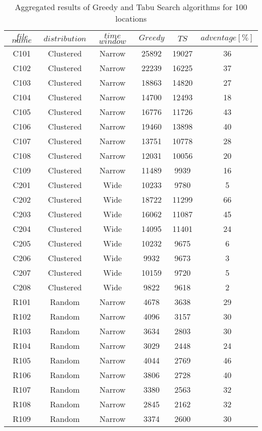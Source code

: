 \begin{table}[t]
\centering
\caption{
Aggregated results of Greedy and Tabu Search algorithms for 100 locations}
\begin{tabular*}{0.8\linewidth}{@{\extracolsep{\fill}}cccccc}
\toprule
$file$ $name$ & $distribution$ & $time$ $window$ & $Greedy$ & $TS$ & $adventage[\%]$ \\ \midrule
C101 & Clustered & Narrow & 25892 & 19027 & 36\\
C102 & Clustered & Narrow & 22239 & 16225 & 37\\
C103 & Clustered & Narrow & 18863 & 14820 & 27\\
C104 & Clustered & Narrow & 14700 & 12493 & 18\\
C105 & Clustered & Narrow & 16776 & 11726 & 43\\
C106 & Clustered & Narrow & 19460 & 13898 & 40\\
C107 & Clustered & Narrow & 13751 & 10778 & 28\\
C108 & Clustered & Narrow & 12031 & 10056 & 20\\
C109 & Clustered & Narrow & 11489 & 9939 & 16\\
C201 & Clustered & Wide & 10233 & 9780 & 5\\
C202 & Clustered & Wide & 18722 & 11299 & 66\\
C203 & Clustered & Wide & 16062 & 11087 & 45\\
C204 & Clustered & Wide & 14095 & 11401 & 24\\
C205 & Clustered & Wide & 10232 & 9675 & 6\\
C206 & Clustered & Wide & 9932 & 9673 & 3\\
C207 & Clustered & Wide & 10159 & 9720 & 5\\
C208 & Clustered & Wide & 9822 & 9618 & 2\\
R101 & Random & Narrow & 4678 & 3638 & 29\\
R102 & Random & Narrow & 4096 & 3157 & 30\\
R103 & Random & Narrow & 3634 & 2803 & 30\\
R104 & Random & Narrow & 3029 & 2448 & 24\\
R105 & Random & Narrow & 4044 & 2769 & 46\\
R106 & Random & Narrow & 3806 & 2728 & 40\\
R107 & Random & Narrow & 3380 & 2563 & 32\\
R108 & Random & Narrow & 2845 & 2162 & 32\\
R109 & Random & Narrow & 3374 & 2600 & 30\\

\end{tabular*}
\end{table}
